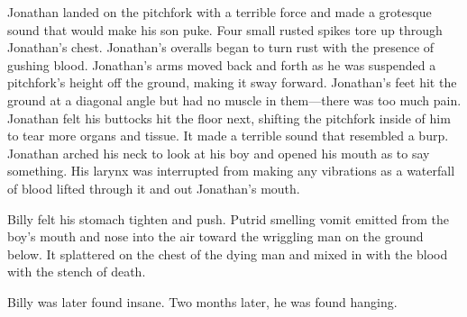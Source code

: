 Jonathan landed on the pitchfork with a terrible force and made a
grotesque sound that would make his son puke. Four small rusted spikes
tore up through Jonathan's chest. Jonathan's overalls began to turn rust
with the presence of gushing blood. Jonathan's arms moved back and forth
as he was suspended a pitchfork's height off the ground, making it sway
forward. Jonathan's feet hit the ground at a diagonal angle but had no
muscle in them---there was too much pain. Jonathan felt his buttocks hit
the floor next, shifting the pitchfork inside of him to tear more organs
and tissue. It made a terrible sound that resembled a burp. Jonathan
arched his neck to look at his boy and opened his mouth as to say
something. His larynx was interrupted from making any vibrations as a
waterfall of blood lifted through it and out Jonathan's mouth.

Billy felt his stomach tighten and push. Putrid smelling vomit emitted
from the boy's mouth and nose into the air toward the wriggling man on
the ground below. It splattered on the chest of the dying man and mixed
in with the blood with the stench of death.

Billy was later found insane. Two months later, he was found hanging.

